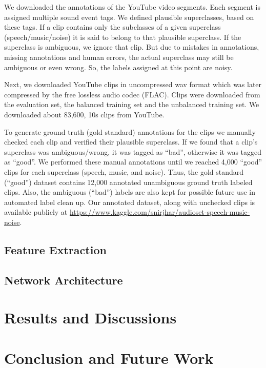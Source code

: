 \documentclass{article}
\begin{document}
We downloaded the annotations of the YouTube video segments. Each segment is assigned multiple sound event tags. We defined plausible superclasses, based on these tags. If a clip contains only the subclasses of a given superclass (speech/music/noise) it is said to belong to that plausible superclass. If the superclass is ambiguous, we ignore that clip. But due to mistakes in annotations, missing annotations and human errors, the actual superclass may still be ambiguous or even wrong. So, the labels assigned at this point are noisy. 

Next, we downloaded YouTube clips in uncompressed wav format which was later compressed by the free lossless audio codec (FLAC). Clips were downloaded from the evaluation set, the balanced training set and the unbalanced training set. We downloaded about 83,600, 10s clips from YouTube.  

To generate ground truth (gold standard) annotations for the clips we manually checked each clip and verified their plausible superclass. If we found that a clip’s superclass was ambiguous/wrong, it was tagged as ``bad'', otherwise it was tagged as ``good''. We performed these manual annotations until we reached 4,000 ``good'' clips for each superclass (speech, music, and noise). Thus, the gold standard (``good'') dataset contains 12,000 annotated unambiguous ground truth labeled clips. Also, the ambiguous (``bad'') labels are also kept for possible future use in automated label clean up. Our annotated dataset, along with unchecked clips is available publicly at \url{https://www.kaggle.com/snirjhar/audioset-speech-music-noise}. 

\subsection{Feature Extraction}

\subsection{Network Architecture}

\section{Results and Discussions}





\section{Conclusion and Future Work}


\printbibliography
\end{document}
